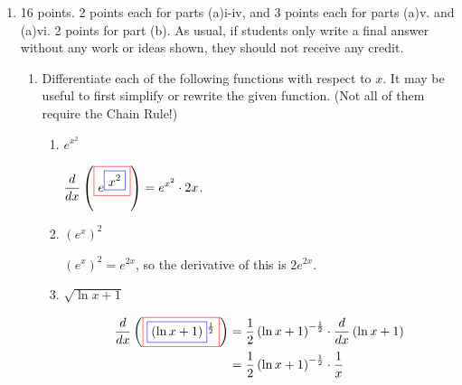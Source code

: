 \documentclass{article}
\begin{document}
\begin{enumerate}
\item
\begin{grading}
    16 points. 2 points each for parts (a)i-iv, and 3 points each for parts (a)v. and (a)vi. 2 points for part (b). As usual, if students only write a final answer without any work or ideas shown, they should not receive any credit.
\end{grading}


  \begin{enumerate}
  \item
Differentiate each of the following functions with respect to $x$. It may be useful to
    first simplify or rewrite the given function.  (Not all of them require the Chain Rule!)

      \begin{enumerate}
      \item
        \begin{problem}[\vfill]
          $e^{x^2}$
        \end{problem}

      \begin{solution}
        $\displaystyle \frac{d}{dx}
        \left(\fcolorbox{red}{white}{$\displaystyle e^ {
              \fcolorbox{blue}{white}{$\displaystyle x^ { 2} $}} $}\right)
        = {} e^ { x^ { 2} } \cdot 2 x$.
      \end{solution}

    \item
      \begin{problem}[\vfill]
        $(e^x)^2$
      \end{problem}

      \begin{solution}
        $(e^x)^2 = e^{2x}$, so the derivative of this is $2 e^ { 2 x}$.
      \end{solution}

    \item
      \begin{problem}[\vfill]
        $\sqrt{\ln x + 1}$
      \end{problem}

      \begin{solution}
        \begin{align*}
          \frac{d}{dx} \left(\fcolorbox{red}{white}{$\displaystyle \fcolorbox{blue}{white}{$\displaystyle \left(\ln x+ 1\right)$}^ { \frac{1}{2}} $}\right) = {} & \frac{1}{2} \left(\ln x+ 1\right)^ { -\frac{1}{2}} \cdot \frac{d}{dx}\left(\ln x+ 1\right) \\
          = {} & \frac{1}{2} \left(\ln x+ 1\right)^ { -\frac{1}{2}} \cdot
          \frac{1}{x}
        \end{align*}
      \end{solution}


\end{enumerate}
\end{enumerate}
\end{enumerate}
\end{document}
